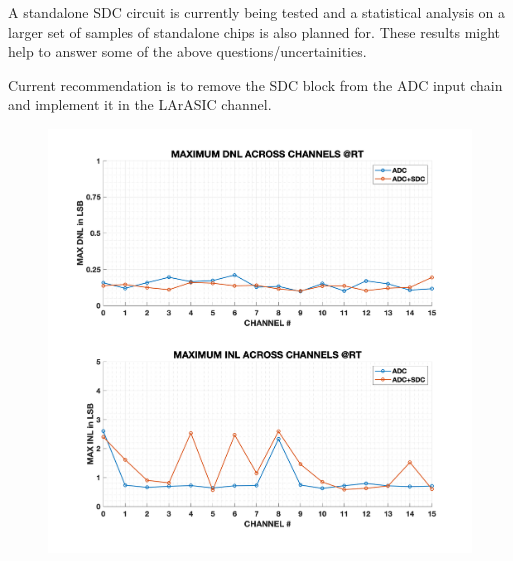 A standalone SDC circuit is currently being tested and a statistical analysis on a larger set of samples of standalone chips is also planned for. These results might help to answer some of the above questions/uncertainities.

Current recommendation is to remove the SDC block from the ADC input chain and implement it in the LArASIC channel.

\begin{figure}[ht!]
\begin{minipage}{.5\textwidth}
  \centering
  \includegraphics[width=1\linewidth]{figures/sdc_measurements/dnl_inl_ch_all_RT.png}
  \label{fig;sdc;inl_dnl_max_rt}
\end{minipage}
\hspace{0.2cm}
\begin{minipage}{.5\textwidth}
  \centering

\end{minipage}
\end{figure}

